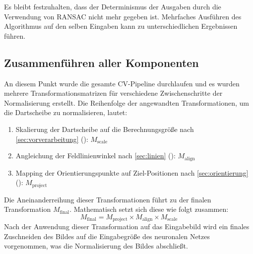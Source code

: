 Es bleibt festzuhalten, dass der Determinismus der Ausgaben durch die Verwendung von RANSAC nicht mehr gegeben ist. Mehrfaches Ausführen des Algorithmus auf den selben Eingaben kann zu unterschiedlichen Ergebnissen führen.

\subsection{Zusammenführen aller Komponenten}
\label{sec:zusammenfuehrung_aller_komponenten_cv}

An diesem Punkt wurde die gesamte CV-Pipeline durchlaufen und es wurden mehrere Transformationsmatrizen für verschiedene Zwischenschritte der Normalisierung erstellt. Die Reihenfolge der angewandten Transformationen, um die Dartscheibe zu normalisieren, lautet:

\begin{enumerate}
    \item Skalierung der Dartscheibe auf die Berechnungsgröße nach \autoref{sec:vorverarbeitung} (): $M_\text{scale}$
    \item Angleichung der Feldlinienwinkel nach \autoref{sec:linien} (): $M_\text{align}$
    \item Mapping der Orientierungspunkte auf Ziel-Positionen nach \autoref{sec:orientierung} (): $M_\text{project}$
\end{enumerate}

Die Aneinanderreihung dieser Transformationen führt zu der finalen Transformation $M_\text{final}$. Mathematisch setzt sich diese wie folgt zusammen:
\[ M_\text{final} = M_\text{project} \times M_\text{align} \times M_\text{scale} \]
Nach der Anwendung dieser Transformation auf das Eingabebild wird ein finales Zuschneiden des Bildes auf die Eingabegröße des neuronalen Netzes vorgenommen, was die Normalisierung des Bildes abschließt.

